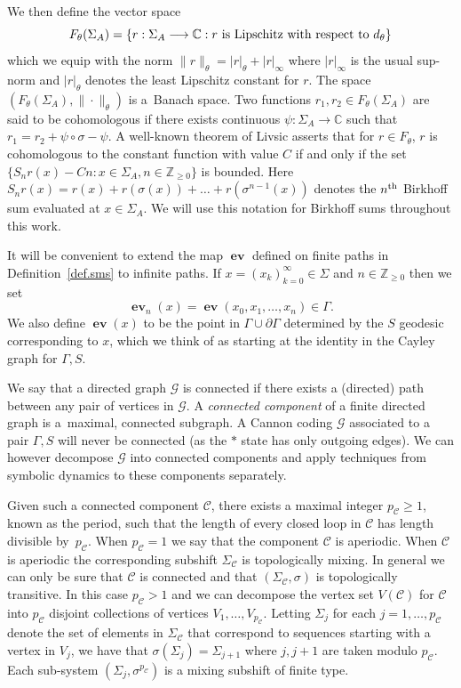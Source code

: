 \documentclass[10pt]{amsart}
\theoremstyle{definition}\newtheorem{defi}[theo]{Definition}\newtheorem{rema}[theo]{Remark}\newtheorem{exam}[theo]{Example}\newtheorem{exem}[theo]{Example}\newtheorem{nota}[theo]{Notation}
\newcommand{\G}{\Gamma}
\renewcommand{\SS}{\Sigma}
\newcommand{\Cc}{\mathcal{C}}
\newcommand{\Gc}{\mathcal{G}}
\newcommand{\C}{\mathbb{C}}
\newcommand{\Z}{\mathbb{Z}}
\DeclareMathOperator{\ev}{\mathbf{ev}}
\let\originalleft\left
\let\originalright\right
\renewcommand{\left}{\mathopen{}\mathclose\bgroup\originalleft}
\renewcommand{\right}{\aftergroup\egroup\originalright}
\renewcommand*{\to}{\mathchoice{\longrightarrow}{\rightarrow}{\rightarrow}{\rightarrow}}
\newcounter{setofcase}
\newcounter{case}[setofcase]
\theoremstyle{plain}
\begin{document}
We then define the vector space
\[
F_\theta(\Sigma_A) = \left\{ r : \Sigma_A \to \C:\text{$r$ is Lipschitz with respect to $d_\theta$} \right\}
\]
which we equip with the norm $\|r\|_\theta = |r|_\theta + |r|_\infty$ where $|r|_\infty$ is the usual sup-norm and $|r|_\theta$ denotes the least Lipschitz constant for $r$. The space $(F_\theta(\Sigma_A), \|\cdot\|_\theta)$ is a~Banach space. Two functions $r_1,r_2 \in F_\theta(\SS_A)$ are said to be cohomologous if there exists continuous $\psi :\Sigma_A \rightarrow \C$ such that $r_1=r_2+\psi \circ \sigma - \psi.$ A well-known theorem of Livsic asserts that for $r\in F_\theta$, $r$ is cohomologous to the constant function with value $C$ if and only if the set $\{S_nr(x) - Cn: x\in \Sigma_A, n \in \Z_{\ge 0}\}$ is bounded. Here $S_nr(x) = r(x) + r(\sigma(x))+\dots+r(\sigma^{n-1}(x))$ denotes the $n^{\rm th}$ Birkhoff sum evaluated at $x\in\Sigma_A$. We will use this notation for Birkhoff sums throughout this work.

It will be convenient to extend the map $\ev$ defined on finite paths in Definition~\ref{def.sms} to infinite paths. If $x = (x_k)_{k=0}^\infty \in \SS$ and $n \in \Z_{\ge 0}$ then we set
\[
\ev_n(x) = \ev(x_0, x_1, \dots, x_n) \in \G.
\]
We also define $\ev(x)$ to be the point in $\G \cup \partial \G$ determined by the $S$ geodesic corresponding to $x$, which we think of as starting at the identity in the Cayley graph for $\G,S$.


We say that a directed graph $\Gc$ is connected if there exists a (directed) path between any pair of vertices in $\Gc$. A \emph{connected component} of a finite directed graph is a~maximal, connected subgraph. A Cannon coding $\Gc$ associated to a pair $\G, S$ will never be connected (as the $\ast$ state has only outgoing edges). We can however decompose $\Gc$ into connected components and apply techniques from symbolic dynamics to these components separately.

Given such a connected component $\Cc$, there exists a maximal integer $p_\Cc \ge 1$, known as the period, such that the length of every closed loop in $\Cc$ has length divisible by~$p_\Cc$. When $p_\Cc =1$ we say that the component $\Cc$ is aperiodic. When $\Cc$ is aperiodic the corresponding subshift $\SS_\Cc$ is topologically mixing. In general we can only be sure that $\Cc$ is connected and that $(\SS_\Cc, \sigma)$ is topologically transitive. In this case $p_\Cc >1$ and we can decompose the vertex set $V(\Cc)$ for $\Cc$ into $p_\Cc$ disjoint collections of vertices $V_1, \dots, V_{p_\Cc}$. Letting $\Sigma_j$ for each $j=1,\dots, p_\Cc$ denote the set of elements in $\SS_\Cc$ that correspond to sequences starting with a vertex in $V_j$, we have that $\sigma(\Sigma_j) = \Sigma_{j+1}$ where $j,j+1$ are taken modulo $p_\Cc$. Each sub-system $(\SS_j, \sigma^{p_\Cc})$ is a mixing subshift of finite type.
\end{document}
